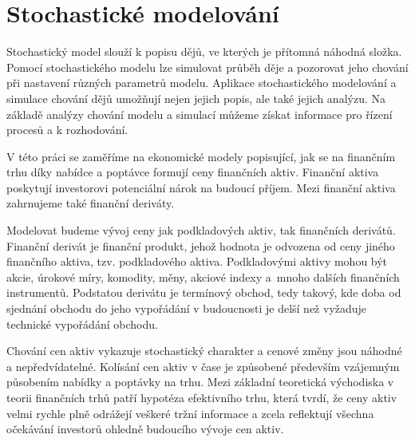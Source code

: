 \documentclass[a4paper,12pt]{report}
\theoremstyle{definition} \newtheorem{definice}[veta]{Definice}
\theoremstyle{remark}
\begin{document}

\chapter{Stochastické modelování}\label{stoch_model}

Stochastický model slouží k popisu dějů, ve kterých je přítomná náhodná složka.
Pomocí stochastického modelu lze simulovat průběh děje a pozorovat jeho chování při nastavení různých parametrů modelu.
Aplikace stochastického modelování a simulace chování dějů umožňují nejen jejich popis, ale také jejich analýzu.
Na základě analýzy chování modelu a simulací můžeme získat informace pro řízení procesů a k rozhodování.

V této práci se zaměříme na ekonomické modely popisující, jak se na finančním trhu díky nabídce a poptávce formují ceny finančních aktiv.
Finanční aktiva poskytují investorovi potenciální nárok na budoucí příjem.
Mezi finanční aktiva zahrnujeme také finanční deriváty.

Modelovat budeme vývoj ceny jak podkladových aktiv, tak finančních derivátů.
Finanční derivát je finanční produkt, jehož hodnota je odvozena od ceny jiného finančního aktiva, tzv. podkladového aktiva.
Podkladovými aktivy mohou být akcie, úrokové míry, komodity, měny, akciové indexy a~mnoho dalších finančních instrumentů.
Podstatou derivátu je termínový obchod, tedy takový, kde doba od sjednání obchodu do jeho vypořádání v budoucnosti  je delší než vyžaduje technické vypořádání obchodu.%

Chování cen aktiv vykazuje stochastický charakter a cenové změny jsou náhodné a nepředvídatelné.
Kolísání cen aktiv v čase je způsobené především vzájemným působením nabídky a poptávky na trhu.
Mezi základní teoretická východiska v teorii finančních trhů patří hypotéza efektivního trhu,
která tvrdí, že ceny aktiv velmi rychle plně odrážejí veškeré tržní informace
a zcela reflektují všechna očekávání investorů ohledně budoucího vývoje cen aktiv.
\end{document}
